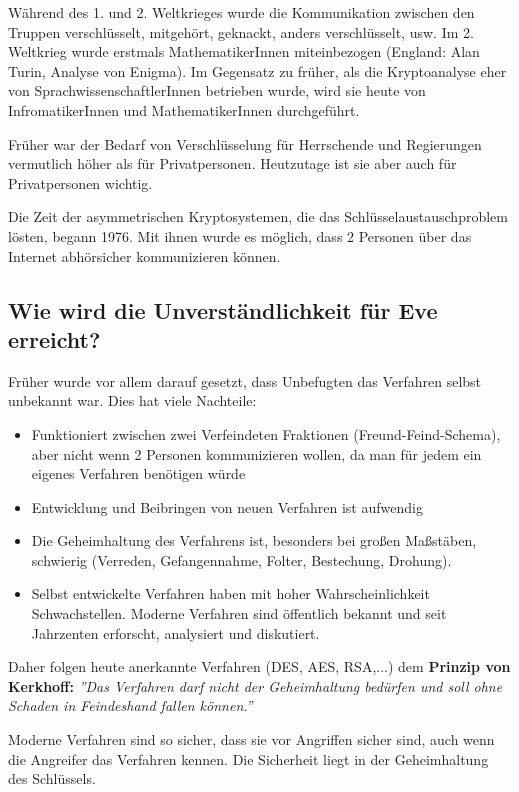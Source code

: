 Während des 1. und 2. Weltkrieges wurde die Kommunikation zwischen den Truppen verschlüsselt, mitgehört, geknackt, anders verschlüsselt, usw. Im 2. Weltkrieg wurde erstmals MathematikerInnen miteinbezogen (England: Alan Turin, Analyse von Enigma). Im Gegensatz zu früher, als die Kryptoanalyse eher von SprachwissenschaftlerInnen betrieben wurde, wird sie heute von InfromatikerInnen und MathematikerInnen durchgeführt.

Früher war der Bedarf von Verschlüsselung für Herrschende und Regierungen vermutlich höher als für Privatpersonen. Heutzutage ist sie aber auch für Privatpersonen wichtig.

Die Zeit der asymmetrischen Kryptosystemen, die das Schlüsselaustauschproblem lösten, begann 1976. Mit ihnen wurde es möglich, dass 2 Personen über das Internet abhörsicher kommunizieren können.

\subsection*{Wie wird die Unverständlichkeit für Eve erreicht?}
Früher wurde vor allem darauf gesetzt, dass Unbefugten das Verfahren selbst unbekannt war. Dies hat viele Nachteile:
\begin{itemize}
	\item Funktioniert zwischen zwei Verfeindeten Fraktionen (Freund-Feind-Schema), aber nicht wenn 2 Personen kommunizieren wollen, da man für jedem ein eigenes Verfahren benötigen würde
	\item Entwicklung und Beibringen von neuen Verfahren ist aufwendig
	\item Die Geheimhaltung des Verfahrens ist, besonders bei großen Maßstäben, schwierig (Verreden, Gefangennahme, Folter, Bestechung, Drohung).
	\item Selbst entwickelte Verfahren haben mit hoher Wahrscheinlichkeit Schwachstellen. Moderne Verfahren sind öffentlich bekannt und seit Jahrzenten erforscht, analysiert und diskutiert.
\end{itemize}

Daher folgen heute anerkannte Verfahren (DES, AES, RSA,...) dem \textbf{Prinzip von Kerkhoff:} \textit{''Das Verfahren darf nicht der Geheimhaltung bedürfen und soll ohne Schaden in Feindeshand fallen können.''} 

Moderne Verfahren sind so sicher, dass sie vor Angriffen sicher sind, auch wenn die Angreifer das Verfahren kennen. Die Sicherheit liegt in der Geheimhaltung des Schlüssels.

